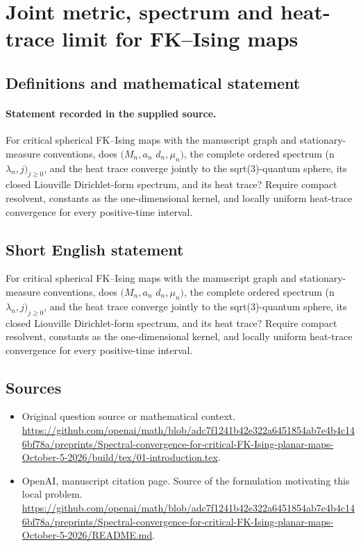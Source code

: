 \documentclass[11pt]{article}
\begin{document}
\section*{Joint metric, spectrum and heat-trace limit for FK–Ising maps}\label{30007354}
\subsection{Definitions and mathematical statement}
\paragraph{Statement recorded in the supplied source.}
For critical spherical FK–Ising maps with the manuscript graph and stationary-measure conventions, does $(M_n,a_n$ $d_n,\mu _n)$, the complete ordered spectrum (n $\lambda _n,j)_{j\geq 0}$, and the heat trace converge jointly to the sqrt(3)-quantum sphere, its closed Liouville Dirichlet-form spectrum, and its heat trace? Require compact resolvent, constants as the one-dimensional kernel, and locally uniform heat-trace convergence for every positive-time interval.
\subsection{Short English statement}
For critical spherical FK–Ising maps with the manuscript graph and stationary-measure conventions, does $(M_n,a_n$ $d_n,\mu _n)$, the complete ordered spectrum (n $\lambda _n,j)_{j\geq 0}$, and the heat trace converge jointly to the sqrt(3)-quantum sphere, its closed Liouville Dirichlet-form spectrum, and its heat trace? Require compact resolvent, constants as the one-dimensional kernel, and locally uniform heat-trace convergence for every positive-time interval.
\subsection{Sources}
\begin{itemize}
\item[S1] Original question source or mathematical context.
\url{https://github.com/openai/math/blob/adc7f1241b42e322a6451854ab7e4b4c146bf78a/preprints/Spectral-convergence-for-critical-FK-Ising-planar-maps-October-5-2026/build/tex/01-introduction.tex}.
\item[S2] OpenAI, manuscript citation page. Source of the formulation motivating this local problem.
\url{https://github.com/openai/math/blob/adc7f1241b42e322a6451854ab7e4b4c146bf78a/preprints/Spectral-convergence-for-critical-FK-Ising-planar-maps-October-5-2026/README.md}.
\end{itemize}
\end{document}
